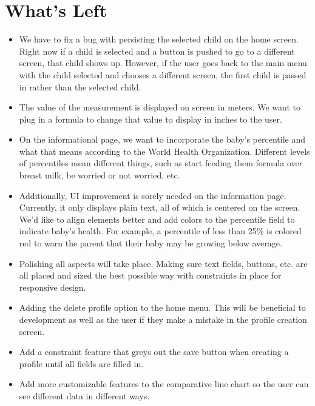 \documentclass[onecolumn, draftclsnofoot,10pt, compsoc]{IEEEtran}
\begin{document}
\section{What's Left}
\begin{itemize}
    \item We have to fix a bug with persisting the selected child on the home screen. Right now if a child is selected and a button is pushed to go to a different screen, that child shows up. However, if the user goes back to the main menu with the child selected and chooses a different screen, the first child is passed in rather than the selected child.\\

    \item The value of the measurement is displayed on screen in meters. We want to plug in a formula to change that value to display in inches to the user.\\

    \item On the informational page, we want to incorporate the baby's percentile and what that means according to the World Health Organization. Different levels of percentiles mean different things, such as start feeding them formula over breast milk, be worried or not worried, etc.\\
    
    \item Additionally, UI improvement is sorely needed on the information page. Currently, it only displays plain text, all of which is centered on the screen. We'd like to align elements better and add colors to the percentile field to indicate baby's health. For example, a percentile of less than 25\% is colored red to warn the parent that their baby may be growing below average.
    
    \item Polishing all aspects will take place. Making sure text fields, buttons, etc. are all placed and sized the best possible way with constraints in place for responsive design.\\
    
    \item Adding the delete profile option to the home menu. This will be beneficial to development as well as the user if they make a mistake in the profile creation screen.\\
    
    \item Add a constraint feature that greys out the save button when creating a profile until all fields are filled in.\\
    
    \item Add more customizable features to the comparative line chart so the user can see different data in different ways.\\
\end{itemize}
\end{document}
